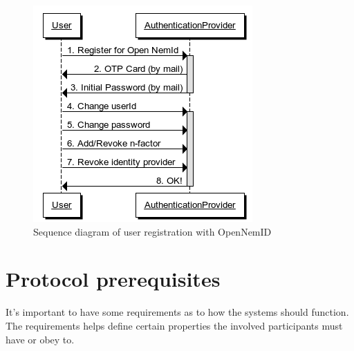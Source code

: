 \documentclass[twosided]{report}
\begin{document}
\begin{figure}[H]
	\centering
	\includegraphics[scale=0.6]{images/Open-NemId-(User-Registration).png}
	\caption{Sequence diagram of user registration with OpenNemID}
\end{figure}

\section{Protocol prerequisites}
It's important to have some requirements as to how the systems should function. The requirements helps define certain properties the involved participants must have or obey to.
\end{document}
